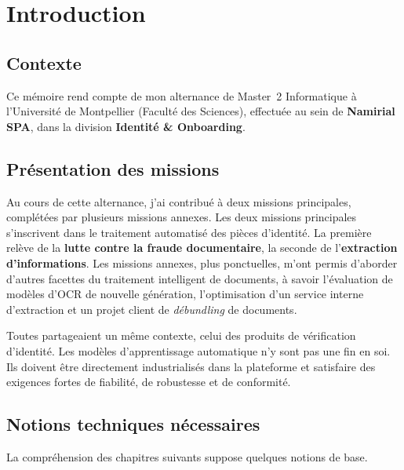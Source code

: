 \chapter{Introduction}\label{ch:intro}


\section*{Contexte}

Ce mémoire rend compte de mon alternance de Master~2 Informatique à l'Université de
Montpellier (Faculté des Sciences), effectuée au sein de \textbf{Namirial SPA}, dans
la division \textbf{Identité \& Onboarding}.

\section*{Présentation des missions}

Au cours de cette alternance, j'ai contribué à deux missions principales, complétées
par plusieurs missions annexes. Les deux missions principales s'inscrivent dans le
traitement automatisé des pièces d'identité. La première relève de la \textbf{lutte
contre la fraude documentaire}, la seconde de l'\textbf{extraction d'informations}.
Les missions annexes, plus ponctuelles, m'ont permis d'aborder d'autres facettes du
traitement intelligent de documents, à savoir l'évaluation de modèles d'OCR de
nouvelle génération, l'optimisation d'un service interne d'extraction et un projet
client de \emph{débundling} de documents.

Toutes partageaient un même contexte, celui des produits de vérification d'identité.
Les modèles d'apprentissage automatique n'y sont pas une fin en soi. Ils doivent être
directement industrialisés dans la plateforme et satisfaire des exigences fortes de
fiabilité, de robustesse et de conformité.

\section*{Notions techniques nécessaires}

La compréhension des chapitres suivants suppose quelques notions de base.

